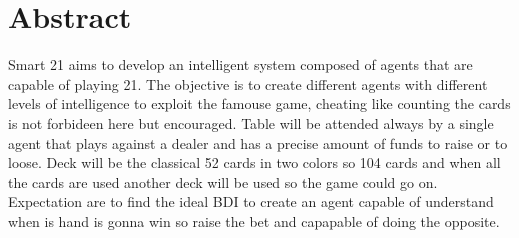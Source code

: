 \chapter*{\center \Large  Abstract}

Smart 21 aims to develop an intelligent system composed of agents that are capable of playing 21. The objective is to create different agents with different levels of intelligence to exploit the famouse game, cheating like counting the cards is not forbideen here but encouraged. Table will be attended always by a single agent that plays against a dealer and has a precise amount of funds to raise or to loose. Deck will be the classical 52 cards in two colors so 104 cards and when all the cards are used another deck will be used so the game could go on.
~\\[0.8cm]%
Expectation are to find the ideal BDI to create an agent capable of understand when is hand is gonna win so raise the bet and capapable of doing the opposite. 






